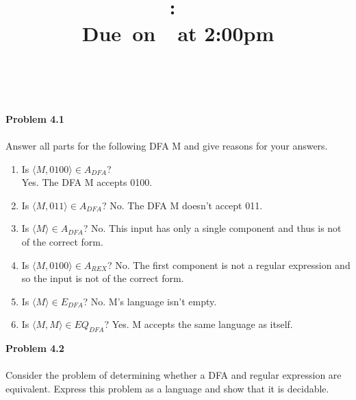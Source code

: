 \documentclass{article}
\title{
  \vspace{2in}
  \textmd{\textbf{\hmwkClass:\ \hmwkTitle}}\\
  \normalsize\vspace{0.1in}\small{Due\ on\ \hmwkDueDate\ at 2:00pm}\\
  \vspace{0.1in}\large{\textit{\hmwkClassInstructor\ \hmwkClassTime}}
  \vspace{3in}
}
\author{\textbf{\hmwkAuthorName}}
\date{}
\newcommand{\problem}[1]{\large{\textbf{Problem #1}}\\}
\begin{document}
\maketitle

\pagebreak

\problem{4.1} \\
Answer all parts for the following DFA M and give reasons for your answers.

{\centering
{}

}

\begin{enumerate}[1., leftmargin = 1.5cm]
\itemsep0em
\item Is $\langle M,0100 \rangle \in A_{DFA}$?\\
    Yes. The DFA M accepts 0100.
\item Is $\langle M,011 \rangle \in A_{DFA}$?
    No. The DFA M doesn't accept 011.
\item Is $\langle M \rangle \in A_{DFA}$?
    No. This input has only a single component and thus is not of the correct form.
\item Is $\langle M,0100 \rangle \in A_{REX}$?
    No. The first component is not a regular expression and so the input is not of the correct form.
\item Is $\langle M \rangle \in E_{DFA}$?
    No. M's language isn't empty.
\item Is $\langle M,M \rangle \in EQ_{DFA}$?
    Yes. M accepts the same language as itself.
\end{enumerate}

\problem{4.2} \\

    Consider the problem of determining whether a DFA and regular expression are equivalent. Express this problem as a language and show that it is decidable. \\
\end{document}
